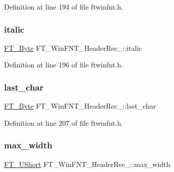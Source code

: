 Definition at line 194 of file ftwinfnt.\+h.

\mbox{\label{struct_f_t___win_f_n_t___header_rec___ac7258944e092264f150c941afd01bbb3}} 
\subsubsection{\texorpdfstring{italic}{italic}}
{\footnotesize\ttfamily \mbox{\hyperlink{fttypes_8h_a51f26183ca0c9f4af958939648caeccd}{F\+T\+\_\+\+Byte}} F\+T\+\_\+\+Win\+F\+N\+T\+\_\+\+Header\+Rec\+\_\+\+::italic}



Definition at line 196 of file ftwinfnt.\+h.

\mbox{\label{struct_f_t___win_f_n_t___header_rec___a2a3cce3fda763be5991e2768feb919b8}} 
\subsubsection{\texorpdfstring{last\_char}{last\_char}}
{\footnotesize\ttfamily \mbox{\hyperlink{fttypes_8h_a51f26183ca0c9f4af958939648caeccd}{F\+T\+\_\+\+Byte}} F\+T\+\_\+\+Win\+F\+N\+T\+\_\+\+Header\+Rec\+\_\+\+::last\+\_\+char}



Definition at line 207 of file ftwinfnt.\+h.

\mbox{\label{struct_f_t___win_f_n_t___header_rec___aaa8bce31720246e1a71194a4b9a4c42c}} 
\subsubsection{\texorpdfstring{max\_width}{max\_width}}
{\footnotesize\ttfamily \mbox{\hyperlink{fttypes_8h_a937f6c17cf5ffd09086d8610c37b9f58}{F\+T\+\_\+\+U\+Short}} F\+T\+\_\+\+Win\+F\+N\+T\+\_\+\+Header\+Rec\+\_\+\+::max\+\_\+width}




